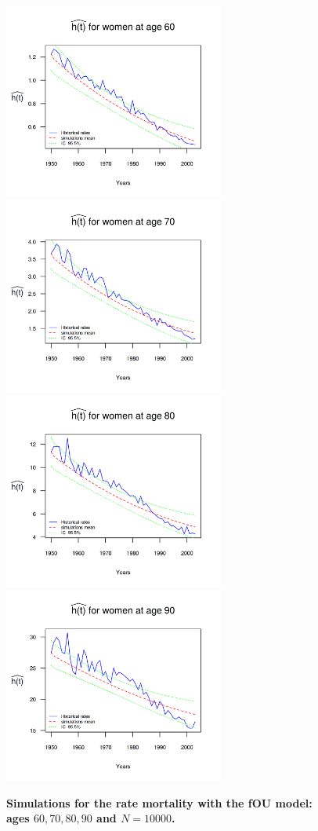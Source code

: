 \documentclass[smallextended]{svjour3}
\begin{document}
\begin{figure}[H]
    \includegraphics[width = 2.85in]{PlotWomen60.png}
    \includegraphics[width = 2.85in]{PlotWomen70.png}
    \includegraphics[width = 2.85in]{PlotWomen80.png}
    \includegraphics[width = 2.85in]{PlotWomen90.png}
    \caption{\bf Simulations for the rate mortality with the fOU model: ages 
    $60,70,80,90$ and $N=10000$.}
    \label{graph-simu_FOU2}
\end{figure}\vspace*{0.1cm}
\end{document}
